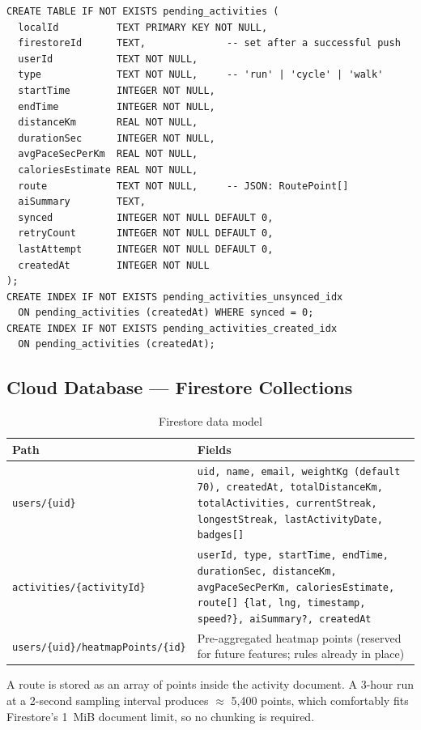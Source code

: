 \documentclass[11pt,a4paper]{report}
\begin{document}
\begin{lstlisting}[style=sql, caption={Local queue schema (\texttt{pending\_activities}, migration v1)}, label={lst:schema}]
CREATE TABLE IF NOT EXISTS pending_activities (
  localId          TEXT PRIMARY KEY NOT NULL,
  firestoreId      TEXT,              -- set after a successful push
  userId           TEXT NOT NULL,
  type             TEXT NOT NULL,     -- 'run' | 'cycle' | 'walk'
  startTime        INTEGER NOT NULL,
  endTime          INTEGER NOT NULL,
  distanceKm       REAL NOT NULL,
  durationSec      INTEGER NOT NULL,
  avgPaceSecPerKm  REAL NOT NULL,
  caloriesEstimate REAL NOT NULL,
  route            TEXT NOT NULL,     -- JSON: RoutePoint[]
  aiSummary        TEXT,
  synced           INTEGER NOT NULL DEFAULT 0,
  retryCount       INTEGER NOT NULL DEFAULT 0,
  lastAttempt      INTEGER NOT NULL DEFAULT 0,
  createdAt        INTEGER NOT NULL
);
CREATE INDEX IF NOT EXISTS pending_activities_unsynced_idx
  ON pending_activities (createdAt) WHERE synced = 0;
CREATE INDEX IF NOT EXISTS pending_activities_created_idx
  ON pending_activities (createdAt);
\end{lstlisting}

\subsection{Cloud Database --- Firestore Collections}
\begin{table}[htbp]
\centering
\caption{Firestore data model}
\begin{tabular}{p{4.6cm} p{10.4cm}}
\toprule
\textbf{Path} & \textbf{Fields} \\
\midrule
\texttt{users/\{uid\}} & \texttt{uid, name, email, weightKg (default 70), createdAt, totalDistanceKm, totalActivities, currentStreak, longestStreak, lastActivityDate, badges[]} \\
\texttt{activities/\{activityId\}} & \texttt{userId, type, startTime, endTime, durationSec, distanceKm, avgPaceSecPerKm, caloriesEstimate, route[] \{lat, lng, timestamp, speed?\}, aiSummary?, createdAt} \\
\texttt{users/\{uid\}/heatmapPoints/\{id\}} & Pre-aggregated heatmap points (reserved for future features; rules already in place) \\
\bottomrule
\end{tabular}
\end{table}

A route is stored as an array of points inside the activity document. A 3-hour run at a 2-second sampling interval produces $\approx$ 5{,}400 points, which comfortably fits Firestore's 1~MiB document limit, so no chunking is required.
\end{document}
